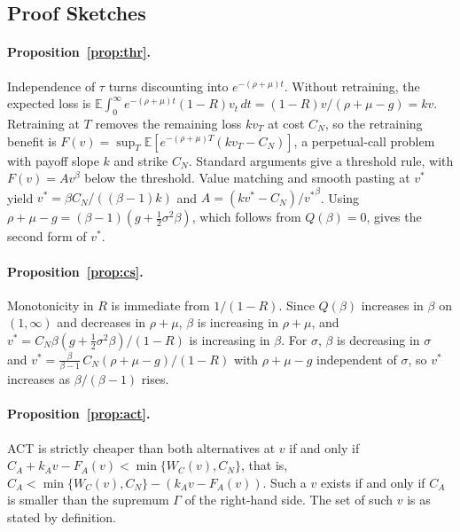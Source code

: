 \documentclass[ijoc,nonblindrev]{informs4}
\newcommand{\E}{\mathbb{E}}
\begin{document}
\begin{APPENDICES}
\section{Proof Sketches}\label{app:proofs}

\paragraph{Proposition~\ref{prop:thr}.} Independence of $\tau$ turns discounting into $e^{-(\rho+\mu)t}$. Without
retraining, the expected loss is $\E\int_0^\infty e^{-(\rho+\mu)t}(1-R)v_t\,dt=(1-R)v/(\rho+\mu-g)=kv$. Retraining at $T$
removes the remaining loss $kv_T$ at cost $C_N$, so the retraining benefit is
$F(v)=\sup_T\E[e^{-(\rho+\mu)T}(kv_T-C_N)]$, a perpetual-call problem with payoff slope $k$ and strike $C_N$. Standard
arguments \citep{dixit1994investment} give a threshold rule, with $F(v)=Av^\beta$ below the threshold. Value matching
and smooth pasting at $v^*$ yield $v^*=\beta C_N/((\beta-1)k)$ and $A=(kv^*-C_N)/{v^*}^\beta$. Using
$\rho+\mu-g=(\beta-1)(g+\tfrac12\sigma^2\beta)$, which follows from $Q(\beta)=0$, gives the second form of $v^*$.

\paragraph{Proposition~\ref{prop:cs}.} Monotonicity in $R$ is immediate from $1/(1-R)$. Since $Q(\beta)$ increases in
$\beta$ on $(1,\infty)$ and decreases in $\rho+\mu$, $\beta$ is increasing in $\rho+\mu$, and
$v^*=C_N\beta(g+\tfrac12\sigma^2\beta)/(1-R)$ is increasing in $\beta$. For $\sigma$, $\beta$ is decreasing in $\sigma$ and
$v^*=\frac{\beta}{\beta-1}\,C_N(\rho+\mu-g)/(1-R)$ with $\rho+\mu-g$ independent of $\sigma$, so $v^*$ increases as
$\beta/(\beta-1)$ rises.

\paragraph{Proposition~\ref{prop:act}.} ACT is strictly cheaper than both alternatives at $v$ if and only if
$C_A+k_Av-F_A(v)<\min\{W_C(v),C_N\}$, that is, $C_A<\min\{W_C(v),C_N\}-(k_Av-F_A(v))$. Such a $v$ exists if and only if
$C_A$ is smaller than the supremum $\Gamma$ of the right-hand side. The set of such $v$ is as stated by definition.
\end{APPENDICES}




\end{document}
